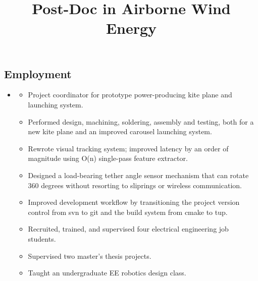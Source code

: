 \documentclass[line,lm,rm,11pt]{res} %
\def\spaceline{\vspace{1mm} \fullline}
\begin{document}
\begin{resume}
\section{Employment}
\begin{itemize}
\item
	\spaceline
	\title{\bf Post-Doc in Airborne Wind Energy }
	\begin{position}
	\vspace{-2mm}
	\begin{itemize}
		\item Project coordinator for prototype power-producing kite plane and launching system.
		\item Performed design, machining, soldering, assembly and testing, both for a new kite plane and an improved carousel launching system. 
		\item Rewrote visual tracking system; improved latency by an order of magnitude using O(n) single-pass feature extractor.
		\item Designed a load-bearing tether angle sensor mechanism that can rotate 360 degrees without resorting to sliprings or wireless communication.
		\item Improved development workflow by transitioning the project version control from svn to git and the build system from cmake to tup.
		\item Recruited, trained, and supervised four electrical engineering job students.
		\item Supervised two master's thesis projects.
		\item Taught an undergraduate EE robotics design class.


\end{itemize}
\end{position}
\end{itemize}
\end{resume}
\end{document}
